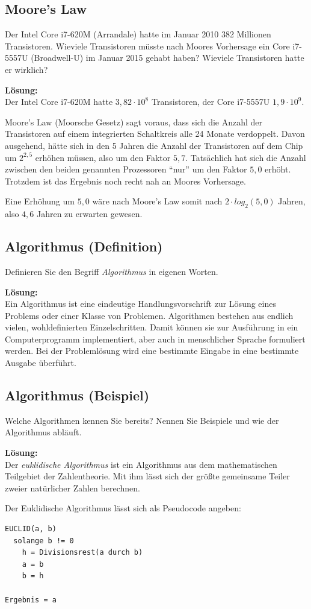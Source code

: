 \documentclass[11pt,a4paper,DIV=12]{scrartcl}
\newcommand{\loesung}{\textbf{Lösung:}\\}
\begin{document}
\subsection{Moore's Law}
Der Intel Core i7-620M (Arrandale) hatte im Januar 2010 382 Millionen Transistoren. Wieviele Transistoren müsste nach Moores Vorhersage ein Core i7-5557U (Broadwell-U) im Januar 2015 gehabt haben? Wieviele Transistoren hatte er wirklich?

\loesung
Der Intel Core i7-620M hatte $3{,}82 \cdot 10^8$ Transistoren, der Core i7-5557U $1{,}9 \cdot 10^9$.

Moore's Law (Moorsche Gesetz) sagt voraus, dass sich die Anzahl der Transistoren auf einem integrierten Schaltkreis alle 24 Monate verdoppelt. Davon ausgehend, hätte sich in den 5 Jahren die Anzahl der Transistoren auf dem Chip um $2^{2{,}5}$ erhöhen müssen, also um den Faktor $5{,}7$. Tatsächlich hat sich die Anzahl zwischen den beiden genannten Prozessoren \enquote{nur} um den Faktor $5{,}0$ erhöht. Trotzdem ist das Ergebnis noch recht nah an Moores Vorhersage.

Eine Erhöhung um $5{,}0$ wäre nach Moore's Law somit nach $2 \cdot log_2(5{,}0)$ Jahren, also $4{,}6$ Jahren zu erwarten gewesen.

\subsection{Algorithmus (Definition)}
Definieren Sie den Begriff \emph{Algorithmus} in eigenen Worten.

\loesung
Ein Algorithmus ist eine eindeutige Handlungsvorschrift zur Lösung eines Problems oder einer Klasse von Problemen. Algorithmen bestehen aus endlich vielen, wohldefinierten Einzelschritten. Damit können sie zur Ausführung in ein Computerprogramm implementiert, aber auch in menschlicher Sprache formuliert werden. Bei der Problemlösung wird eine bestimmte Eingabe in eine bestimmte Ausgabe überführt.

\subsection{Algorithmus (Beispiel)}
Welche Algorithmen kennen Sie bereits? Nennen Sie Beispiele und wie der Algorithmus abläuft.

\loesung
Der \emph{euklidische Algorithmus} ist ein Algorithmus aus dem mathematischen Teilgebiet der Zahlentheorie. Mit ihm lässt sich der größte gemeinsame Teiler zweier natürlicher Zahlen berechnen.

Der Euklidische Algorithmus lässt sich als Pseudocode angeben:

\begin{lstlisting}
EUCLID(a, b)
  solange b != 0
    h = Divisionsrest(a durch b)
    a = b
    b = h

Ergebnis = a
\end{lstlisting}

\end{document}
